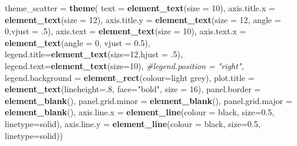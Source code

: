 \documentclass[
]{article}
\newenvironment{Shaded}{\begin{snugshade}}{\end{snugshade}}
\newcommand{\AttributeTok}[1]{\textcolor[rgb]{0.13,0.29,0.53}{#1}}
\newcommand{\CommentTok}[1]{\textcolor[rgb]{0.56,0.35,0.01}{\textit{#1}}}
\newcommand{\DecValTok}[1]{\textcolor[rgb]{0.00,0.00,0.81}{#1}}
\newcommand{\FloatTok}[1]{\textcolor[rgb]{0.00,0.00,0.81}{#1}}
\newcommand{\FunctionTok}[1]{\textcolor[rgb]{0.13,0.29,0.53}{\textbf{#1}}}
\newcommand{\NormalTok}[1]{#1}
\newcommand{\OtherTok}[1]{\textcolor[rgb]{0.56,0.35,0.01}{#1}}
\newcommand{\StringTok}[1]{\textcolor[rgb]{0.31,0.60,0.02}{#1}}
\begin{document}
\begin{Shaded}
\begin{Highlighting}[]
\NormalTok{theme\_scatter }\OtherTok{=} \FunctionTok{theme}\NormalTok{(}
\AttributeTok{text =} \FunctionTok{element\_text}\NormalTok{(}\AttributeTok{size =} \DecValTok{10}\NormalTok{),}
\AttributeTok{axis.title.x =} \FunctionTok{element\_text}\NormalTok{(}\AttributeTok{size =} \DecValTok{12}\NormalTok{),}
\AttributeTok{axis.title.y =} \FunctionTok{element\_text}\NormalTok{(}\AttributeTok{size =} \DecValTok{12}\NormalTok{, }\AttributeTok{angle =} \DecValTok{0}\NormalTok{,}\AttributeTok{vjust =}\NormalTok{ .}\DecValTok{5}\NormalTok{),}
\AttributeTok{axis.text =} \FunctionTok{element\_text}\NormalTok{(}\AttributeTok{size =} \DecValTok{10}\NormalTok{),}
\AttributeTok{axis.text.x =} \FunctionTok{element\_text}\NormalTok{(}\AttributeTok{angle =} \DecValTok{0}\NormalTok{, }\AttributeTok{vjust =} \FloatTok{0.5}\NormalTok{),}
\AttributeTok{legend.title=}\FunctionTok{element\_text}\NormalTok{(}\AttributeTok{size=}\DecValTok{12}\NormalTok{,}\AttributeTok{hjust =}\NormalTok{ .}\DecValTok{5}\NormalTok{),}
\AttributeTok{legend.text=}\FunctionTok{element\_text}\NormalTok{(}\AttributeTok{size=}\DecValTok{10}\NormalTok{),}
\CommentTok{\#legend.position = "right",}
\AttributeTok{legend.background =} \FunctionTok{element\_rect}\NormalTok{(}\AttributeTok{colour=}\StringTok{\textquotesingle{}light grey\textquotesingle{}}\NormalTok{),}
\AttributeTok{plot.title =} \FunctionTok{element\_text}\NormalTok{(}\AttributeTok{lineheight=}\NormalTok{.}\DecValTok{8}\NormalTok{, }\AttributeTok{face=}\StringTok{"bold"}\NormalTok{, }\AttributeTok{size =} \DecValTok{16}\NormalTok{),}
\AttributeTok{panel.border =} \FunctionTok{element\_blank}\NormalTok{(),}
\AttributeTok{panel.grid.minor =} \FunctionTok{element\_blank}\NormalTok{(),}
\AttributeTok{panel.grid.major =} \FunctionTok{element\_blank}\NormalTok{(),}
\AttributeTok{axis.line.x =} \FunctionTok{element\_line}\NormalTok{(}\AttributeTok{colour =} \StringTok{\textquotesingle{}black\textquotesingle{}}\NormalTok{, }\AttributeTok{size=}\FloatTok{0.5}\NormalTok{, }\AttributeTok{linetype=}\StringTok{\textquotesingle{}solid\textquotesingle{}}\NormalTok{),}
\AttributeTok{axis.line.y =} \FunctionTok{element\_line}\NormalTok{(}\AttributeTok{colour =} \StringTok{\textquotesingle{}black\textquotesingle{}}\NormalTok{, }\AttributeTok{size=}\FloatTok{0.5}\NormalTok{, }\AttributeTok{linetype=}\StringTok{\textquotesingle{}solid\textquotesingle{}}\NormalTok{))}
\end{Highlighting}
\end{Shaded}
\end{document}
